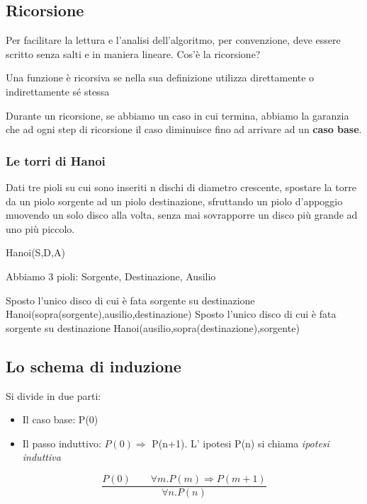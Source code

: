 \documentclass[twocolumn]{article}
\newcommand{\definition}[1]{\begin{mycolorbox}[colback=colorone]
\fontfamily{qcr}\selectfont #1 \fontfamily{cmr}\selectfont
\end{mycolorbox}}
\begin{document}
\subsection{Ricorsione}
Per facilitare la lettura e l'analisi dell'algoritmo, per convenzione, deve essere scritto senza salti e in maniera lineare.
\newline Cos'è la ricorsione? \definition{Una funzione è ricorsiva se nella sua definizione utilizza direttamente o indirettamente sé stessa}

Durante un ricorsione, se abbiamo un caso in cui termina, abbiamo la garanzia che ad ogni step di ricorsione il caso diminuisce fino ad arrivare ad un \textbf{caso base}.
\subsubsection{Le torri di Hanoi}
Dati tre pioli su cui sono inseriti n dischi di diametro crescente, spostare la torre da un piolo sorgente ad un piolo destinazione, sfruttando un piolo d'appoggio muovendo un solo disco alla volta, senza mai sovrapporre un disco più grande ad uno più piccolo.
\begin{algorithm}
    \caption{Hanoi(S,D,A)}
    \begin{algorithmic}
    \REQUIRE Abbiamo 3 pioli: Sorgente, Destinazione, Ausilio
    
       \STATE
            \STATE Sposto l'unico disco di cui è fata sorgente su destinazione
        \ELSE
        \STATE Hanoi(sopra(sorgente),ausilio,destinazione)
        \STATE Sposto l'unico disco di cui è fata sorgente su destinazione
        \STATE Hanoi(ausilio,sopra(destinazione),sorgente)
        \ENDIF
    \end{algorithmic}
\end{algorithm}
\subsection{Lo schema di induzione}
Si divide in due parti: \begin{itemize}
    \item Il caso base: P(0)
    \item Il passo induttivo: $P(0) \Rightarrow$ P(n+1). L' ipotesi P(n) si chiama \textit{ipotesi induttiva}
\end{itemize}
\[ \frac{P(0) \qquad \forall m.P(m) \Rightarrow P(m+1)}{\forall n.P(n)}\]
\end{document}
